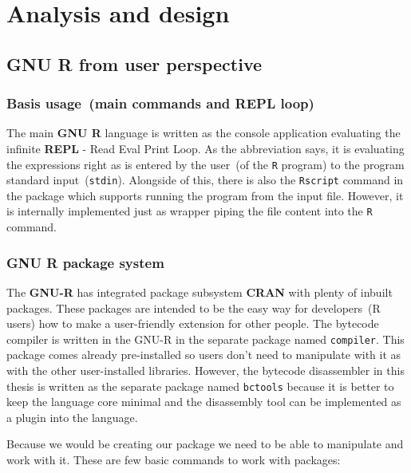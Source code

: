 \documentclass[thesis=M,english]{FITthesis}[2018/10/20]
\newcommand{\code}[1]{\texttt{#1}}
\begin{document}

\chapter{Analysis and design}

\section{GNU R from user perspective}\label{R-UI}

\subsection{Basis usage~(main commands and REPL loop)}\label{REPL}

The main \textbf{GNU R} language is written as the console application evaluating the infinite \textbf{REPL} - Read Eval Print Loop. As the abbreviation says, it is evaluating the expressions right as is entered by the user~(of the \code{R} program) to the program standard input~(\code{stdin}). Alongside of this, there is also the \code{Rscript} command in the package which supports running the program from the input file. However, it is internally implemented just as wrapper piping the file content into the \code{R} command.

\subsection{GNU R package system}\label{R-Packages}

The \textbf{GNU-R} has integrated package subsystem \textbf{CRAN} with plenty of inbuilt packages. These packages are intended to be the easy way for developers~(R users) how to make a user-friendly extension for other people. The bytecode compiler is written in the GNU-R in the separate package named \code{compiler}. This package comes already pre-installed so users don't need to manipulate with it as with the other user-installed libraries. However, the bytecode disassembler in this thesis is written as the separate package named \code{bctools} because it is better to keep the language core minimal and the disassembly tool can be implemented as a plugin into the language.

Because we would be creating our package we need to be able to manipulate and work with it. These are few basic commands to work with packages:
\end{document}
